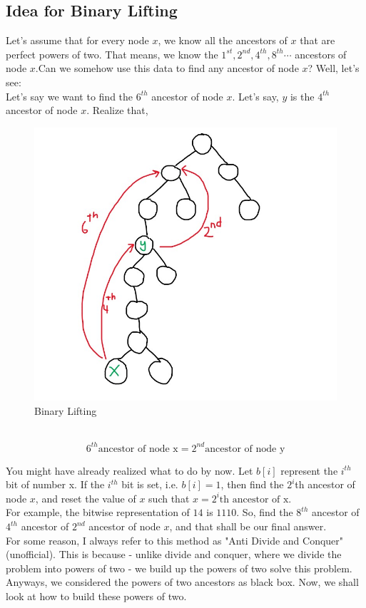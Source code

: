 \subsection{Idea for Binary Lifting}
Let's assume that for every node $x$, we know all the ancestors of $x$ that are perfect powers of two. That means, we know the $1^{st} , 2^{nd}, 4^{th} , 8^{th} \cdots$ ancestors of node $x$.Can we somehow use this data to find any ancestor of node $x$? Well, let's see: \\
Let's say we want to find the $6^{th}$ ancestor of node $x$. Let's say, $y$ is the $4^{th}$ ancestor of node $x$. Realize that,\\
\begin{figure}[h]
    \centering
    \includegraphics[scale=0.5]{images/lifting.jpg}
    \caption{Binary Lifting}
    \label{fig:my_label}
    
\end{figure}
\\ $$6^{th} \text{ancestor of node x} = 2^{nd} \text{ancestor of node y}$$

You might have already realized what to do by now. Let $b[i]$ represent the $i^{th}$ bit of number x. If the $i^{th}$ bit is set, i.e. $b[i] = 1$, then find the $2^{i}$th ancestor of node $x$, and reset the value of $x$ such that $x = 2^{i}\text{th ancestor of x}$. \\
For example, the bitwise representation of $14$ is $1110$. So, find the $8^{th}$ ancestor of $4^{th}$ ancestor of $2^{nd}$ ancestor of node $x$, and that shall be our final answer.\\
For some reason, I always refer to this method as "Anti Divide and Conquer" (unofficial). This is because - unlike divide and conquer, where we divide the problem into powers of two - we build up the powers of two solve this problem. Anyways, we considered the powers of two ancestors as black box. Now, we shall look at how to build these powers of two.

